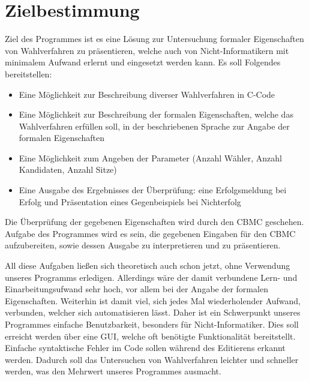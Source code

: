 \documentclass[a4paper]{scrreprt}
\begin{document}
\chapter{Zielbestimmung}
Ziel des Programmes ist es eine  Lösung zur Untersuchung formaler Eigenschaften von Wahlverfahren zu präsentieren, welche auch von Nicht-Informatikern mit minimalem Aufwand erlernt und eingesetzt werden kann. 
Es soll Folgendes bereitstellen:
\begin{itemize}
\item Eine Möglichkeit zur Beschreibung diverser Wahlverfahren in C-Code  
\item Eine Möglichkeit zur Beschreibung der formalen Eigenschaften, welche das Wahlverfahren erfüllen soll, in der beschriebenen Sprache zur Angabe der formalen Eigenschaften
\item Eine Möglichkeit zum Angeben der Parameter (Anzahl Wähler, Anzahl Kandidaten, Anzahl Sitze) 
\item Eine Ausgabe des Ergebnisses der Überprüfung: eine Erfolgsmeldung bei Erfolg und Präsentation eines Gegenbeispiels bei Nichterfolg
\end{itemize}

Die Überprüfung der gegebenen Eigenschaften wird durch den \ac{CBMC} geschehen. Aufgabe des Programmes wird es sein, die gegebenen Eingaben für den \ac{CBMC} aufzubereiten, sowie dessen Ausgabe zu interpretieren und zu präsentieren. 

All diese Aufgaben ließen sich theoretisch auch schon jetzt, ohne Verwendung unseres Programms erledigen. Allerdings wäre der damit verbundene Lern- und Einarbeitungsufwand sehr hoch, vor allem bei der Angabe der formalen Eigenschaften. Weiterhin ist damit viel, sich jedes Mal wiederholender Aufwand, verbunden, welcher sich automatisieren lässt. Daher ist ein Schwerpunkt unseres Programmes einfache Benutzbarkeit, besonders für Nicht-Informatiker. Dies soll erreicht werden über eine \ac{GUI}, welche oft benötigte Funktionalität bereitstellt. Einfache syntaktische Fehler im Code sollen während des Editierens erkannt werden. Dadurch soll das Untersuchen von Wahlverfahren leichter und schneller werden, was den Mehrwert unseres Programmes ausmacht.
\end{document}
